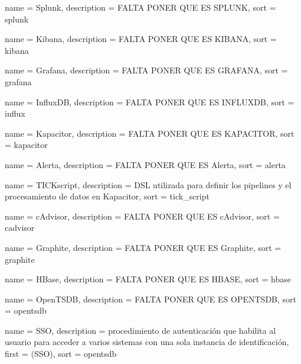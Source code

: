 {
  name        = {Splunk},
  description = {FALTA PONER QUE ES SPLUNK},
  sort        = {splunk}
}

 {
  name        = {Kibana},
  description = {FALTA PONER QUE ES KIBANA},
  sort        = {kibana}
}

 {
  name        = {Grafana},
  description = {FALTA PONER QUE ES GRAFANA},
  sort        = {grafana}
}

 {
  name        = {InfluxDB},
  description = {FALTA PONER QUE ES INFLUXDB},
  sort        = {influx}
}

 {
  name        = {Kapacitor},
  description = {FALTA PONER QUE ES KAPACITOR},
  sort        = {kapacitor}
}

 {
  name        = {Alerta},
  description = {FALTA PONER QUE ES Alerta},
  sort        = {alerta}
}

 {
  name        = {TICKscript},
  description =
    {DSL utilizada para definir los pipelines y el procesamiento de datos en
    Kapacitor},
  sort        = {tick_script}
}

 {
  name        = {cAdvisor},
  description = {FALTA PONER QUE ES cAdvisor},
  sort        = {cadvisor}
}

 {
  name        = {Graphite},
  description = {FALTA PONER QUE ES Graphite},
  sort        = {graphite}
}

 {
  name        = {HBase},
  description = {FALTA PONER QUE ES HBASE},
  sort        = {hbase}
}

 {
  name        = {OpenTSDB},
  description = {FALTA PONER QUE ES OPENTSDB},
  sort        = {opentsdb}
}

 {
  name        = {SSO},
  description =
    {procedimiento de autenticación que habilita al usuario para acceder a
    varios sistemas con una sola instancia de identificación},
  first       = { (SSO)},
  sort        = {opentsdb}
}

